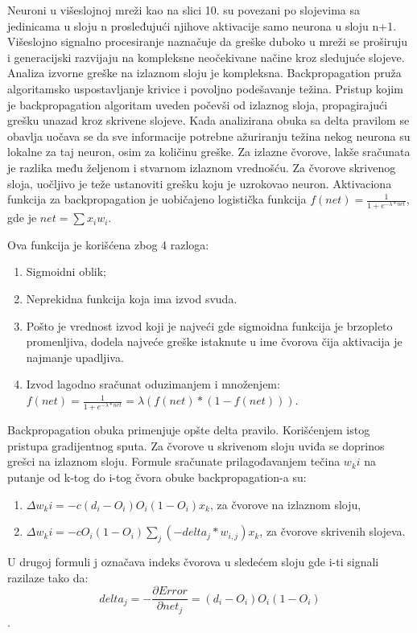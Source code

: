 \documentclass[fontsize=11bp, paper=a4]{scrarticle}
\begin{document}
Neuroni u višeslojnoj mreži kao na slici 10. su povezani po slojevima sa jedinicama u sloju n prosleđujući njihove aktivacije samo neurona u sloju n+1. Višeslojno signalno procesiranje naznačuje da greške duboko u mreži se proširuju i generacijski razvijaju na kompleksne neočekivane načine kroz sledujuće slojeve. Analiza izvorne greške na izlaznom sloju je kompleksna. Backpropagation pruža algoritamsko uspostavljanje krivice i povoljno podešavanje težina. Pristup kojim je backpropagation algoritam uveden počevši od izlaznog sloja, propagirajući grešku unazad kroz skrivene slojeve. Kada analizirana obuka sa delta pravilom se obavlja uočava se da sve informacije potrebne ažuriranju težina nekog neurona su lokalne za taj neuron, osim za količinu greške. Za izlazne čvorove, lakše sračunata je razlika među željenom i stvarnom izlaznom vrednošću. Za čvorove skrivenog sloja, uočljivo je teže ustanoviti grešku koju je uzrokovao neuron. Aktivaciona funkcija za backpropagation je uobičajeno logistička funkcija $f(net) = \frac{1}{1+e^{-\lambda*net}}$, gde je $net = \sum x_i w_i$.

Ova funkcija je korišćena zbog 4 razloga:
\begin{enumerate}
    \item Sigmoidni oblik;
    \item Neprekidna funkcija koja ima izvod svuda.
    \item Pošto je vrednost izvod koji je najveći gde sigmoidna funkcija je brzopleto promenljiva, dodela najveće greške istaknute u ime čvorova čija aktivacija je najmanje upadljiva.
    \item Izvod lagodno sračunat oduzimanjem i množenjem: $f(net) = \frac{1}{1+e^{-\lambda*net}} = \lambda (f(net) * (1 - f(net)))$.
\end{enumerate}

Backpropagation obuka primenjuje opšte delta pravilo. Korišćenjem istog pristupa gradijentnog sputa. Za čvorove u skrivenom sloju uviđa se doprinos grešci na izlaznom sloju. Formule sračunate prilagođavanjem tečina $w_ki$ na putanje od k-tog do i-tog čvora obuke backpropagation-a su:
\begin{enumerate}
    \item $\Delta w_ki = - c(d_i - O_i) O_i (1-O_i) x_k$, za čvorove na izlaznom sloju,
    \item $\Delta w_ki = - c O_i (1-O_i) \sum_j (-delta_j*w_{i,j}) x_k$, za čvorove skrivenih slojeva.
\end{enumerate}

U drugoj formuli j označava indeks čvorova u sledećem sloju gde i-ti signali razilaze tako da: 
$$delta_j = -\frac{\partial Error}{\partial net_j} = (d_i - O_i)O_i(1-O_i)$$.
\end{document}
